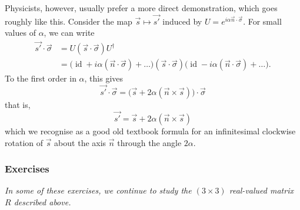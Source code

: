 \documentclass{article}
\begin{document}
Physicists, however, usually prefer a more direct demonstration, which goes roughly like this.
Consider the map \(\vec{s} \mapsto \vec{s'}\) induced by \(U=e^{i \alpha \vec{n}\cdot\vec{\sigma}}\).
For small values of \(\alpha\), we can write
\[
  \begin{aligned}
    \vec{s'}\cdot\vec{\sigma}
    &= U(\vec{s}\cdot\vec{\sigma}) U^\dagger
  \\&= \Big(
      \operatorname{id}+i\alpha (\vec{n}\cdot\vec{\sigma})+\ldots
    \Big)
    (\vec{s}\cdot\vec{\sigma}) 
    \Big(
      \operatorname{id}- i\alpha(\vec{n}\cdot\vec{\sigma})+\ldots
    \Big).
  \end{aligned}
\]
To the first order in \(\alpha\), this gives
\[
  \vec{s'} \cdot\vec{\sigma}
  = \Big(
    \vec{s} + 2\alpha (\vec{n}\times\vec{s})
  \Big)
  \cdot \vec{\sigma}
\]
that is,
\[
  \vec{s'} =
  \vec{s} + 2\alpha(\vec{n}\times\vec{s})
\]
which we recognise as a good old textbook formula for an infinitesimal clockwise rotation of \(\vec{s}\) about the axis \(\vec{n}\) through the angle \(2\alpha\).

\hypertarget{exercises-3}{%
\subsubsection{Exercises}\label{exercises-3}}

\emph{In some of these exercises, we continue to study the \((3\times 3)\) real-valued matrix \(R\) described above.}
\end{document}
